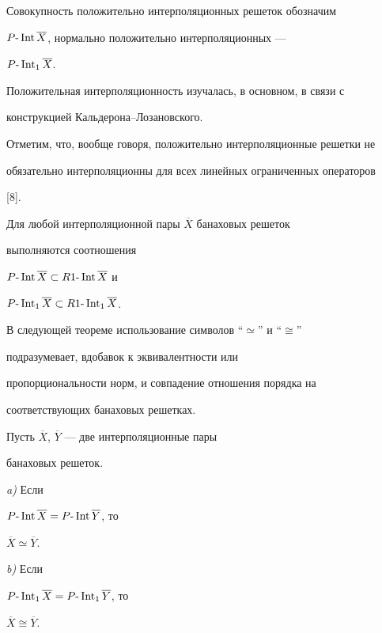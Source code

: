 Совокупность положительно интерполяционных решеток обозначим 


$P\text{-}\operatorname{Int} \overline X$, нормально положительно интерполяционных --- 


$P\text{-}\operatorname{Int}_1 \overline X$. 





Положительная интерполяционность изучалась, в основном, в связи с 


конструкцией Каль\-де\-ро\-на--Лозановского.  


Отметим, что, вообще говоря, положительно интерполяционные решетки не 


обязательно интерполяционны для всех линейных ограниченных операторов 


[8].





\begin{lem}


Для любой интерполяционной пары $\overline X$ банаховых решеток 


выполняются соотношения 


$P\text{-}\operatorname{Int} \overline X \subset R1\text{-}\operatorname{Int} \overline X$ и 


$P\text{-}\operatorname{Int}_1 \overline X \subset R1\text{-}\operatorname{Int}_1 \overline X$.


\end{lem} 





В следующей теореме использование символов ``$\simeq $'' и ``$\cong $''  


подразумевает, вдобавок к эквивалентности или 


пропорциональности норм, и совпадение отношения порядка на 


соответствующих банаховых решетках.





\begin{thm}


Пусть $\overline X$, $\overline Y$ --- две интерполяционные пары


банаховых решеток.





{\em a)} Если 


$P\text{-}\operatorname{Int} \overline X = P\text{-}\operatorname{Int} \overline Y$, то 


$\overline X \simeq \overline Y$.





{\em b)} Если 


$P\text{-}\operatorname{Int}_1 \overline X = P\text{-}\operatorname{Int}_1 \overline Y$, то 


$\overline X \cong \overline Y$.


\end{thm}





